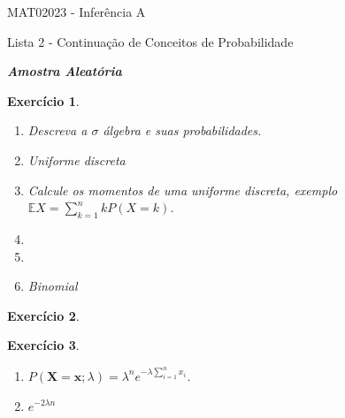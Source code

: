 \documentclass[letter,11pt]{article}
\newtheorem{exer}{Exercício}
\newcommand{\E}{\mathbb{E}}
\begin{document}
\begin{center}{ \Large MAT02023 - Inferência A }\end{center}

\begin{center}
{\large  \sc Lista 2 - Continuação de Conceitos de Probabilidade}
\end{center}
\vspace{15mm}


\noindent \textit{\textbf{Amostra Aleatória}}


\begin{exer} \rm
\begin{enumerate}[\bf(a)]  
\item Descreva a $\sigma$ álgebra e suas probabilidades.
\item Uniforme discreta
\item Calcule os momentos de uma uniforme discreta, exemplo $\E X=\sum_{k=1}^{n} k P(X=k)$.
\item
\item
\item Binomial
\end{enumerate}
\end{exer}

\medskip
\begin{exer} \rm
{}
\end{exer}


\medskip
\begin{exer} \rm
\begin{enumerate}[\bf(a)]
  \item $P( = ; \lambda) = \lambda^n e^{-\lambda \sum_{i=1}^{n} x_i}$.
  \item $e^{-2 \lambda n}$
\end{enumerate}
\end{exer}
\end{document}
